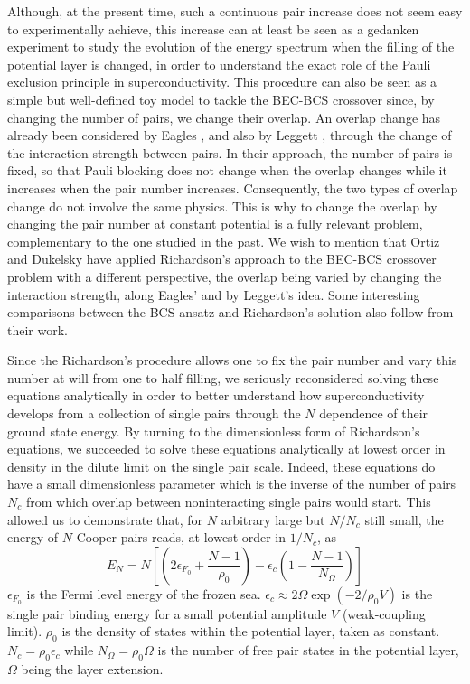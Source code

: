 \documentclass[aps,prb,superscriptaddress,showpacs,reprint,lengthcheck]{revtex4}
\begin{document}
Although, at the present time, such a continuous pair increase
does not seem easy to experimentally achieve, this increase can at least be seen as a 
gedanken experiment to study the evolution of the energy spectrum when
the filling of the potential layer is changed, in order to understand the exact role of the Pauli
exclusion principle in superconductivity. 
This procedure can also be
seen as a simple but well-defined toy model to tackle the BEC-BCS crossover
since, by changing the number of pairs, we change their overlap. 
An overlap change has already been considered by Eagles \cite{Eagle}, 
and also by Leggett \cite{LeggettCrossover}, through the change of the interaction strength between pairs. In their approach, the number of pairs is fixed, so that Pauli blocking does not change when the overlap changes while it increases when the pair number increases. Consequently, the two types of overlap change do not involve the same physics. This is why to change the overlap by changing the pair number at constant potential is a fully relevant problem, complementary to the one studied in the past. We wish to mention that Ortiz and Dukelsky have applied Richardson's approach to the BEC-BCS crossover problem with a different perspective, the overlap being varied by changing the interaction strength\cite{crossoverRich}, along Eagles' and by Leggett's idea.  Some interesting comparisons between the BCS ansatz and Richardson's solution also follow from their work.  


Since the Richardson's procedure allows one to fix the pair number and vary 
this number at will from one to half filling, we seriously reconsidered 
solving these equations analytically in order to better understand how superconductivity develops from a collection of single pairs through the $N$ dependence of their ground state energy. By turning to the dimensionless form of Richardson's equations, we succeeded to solve these equations analytically at lowest order in density in the dilute limit on the single pair scale\cite{paper1}. 
Indeed, these equations do have a small dimensionless parameter which is the inverse of the number of pairs $N_{c}$ from which overlap between noninteracting single pairs would start. 
This allowed us to demonstrate that, for $N$ arbitrary large but $N/N_{c}$ still small, 
the energy of $N$ Cooper pairs reads, at lowest order in $1/ N_{c}$, as
\begin{equation}
E_{N}= N\left[ \left( 2\epsilon _{F_{0}}+\frac{N-1}{\rho _{0}}%
\right)-\epsilon _{c}\left( 1-\frac{N-1}{N_{\Omega }}\right) \right]
\label{eq:eN}
\end{equation}%
$\epsilon _{F_{0}}$ is the Fermi level energy of the frozen sea.  $\epsilon _{c}\approx
2\Omega \exp \left( -2/\rho _{0}V\right) $ is the single pair binding
energy for a small potential amplitude $V$ (weak-coupling limit). $\rho
_{0} $ is the density of states within the potential
layer, taken as constant. $N_{c }=\rho _{0}\epsilon _{c} $ while $N_{\Omega }=\rho _{0}\Omega $ is the number of free pair states in the potential
layer, $\Omega $ being the layer extension.
\end{document}

